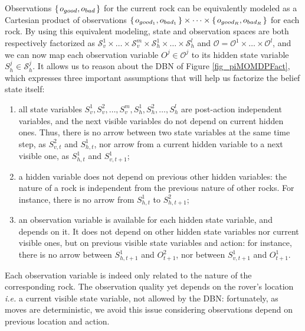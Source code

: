 Observations $\left\{ \left.  o_{good},o_{bad}  \right. \right\}$ for the current rock can be equivalently 
modeled as a Cartesian product of observations $\left\{ \left.  o_{good_1},o_{bad_1}  \right. \right\} \times \cdots \times \left\{ \left.  o_{good_R},o_{bad_R}  \right. \right\}$ 
for each rock. By using this equivalent modeling, state and observation spaces 
are both respectively factorized as 
$\mathcal{S}^1_v \times \ldots \times \mathcal{S}^m_v \times \mathcal{S}^1_h \times \ldots \times \mathcal{S}^l_h $
 and $\mathcal{O} = \mathcal{O}^1 \times \ldots \times \mathcal{O}^l$, and we can now map each observation variable 
$O^j \in \mathcal{O}^j$ to its hidden state variable $S^j_h \in \mathcal{S}^j_h$. 
It allows us to reason 
about the DBN of Figure \ref{fig_piMOMDPFact}, 
which expresses three important assumptions 
that will help us factorize the belief state itself:
\begin{enumerate}
\item all state variables $S^1_v,S^2_v,\ldots,S^m_v,S^1_h,S^2_h,\ldots,S^l_h$ are post-action independent 
variables, and the next visible variables do not depend on current hidden ones.
Thus, there is no arrow between two state variables at the same time step, as $S^2_{v,t}$ and $S^1_{h,t}$,
nor arrow from a current hidden variable to a next visible one, as $S^1_{h,t}$ and $S^1_{v,t+1}$;
\item a hidden variable does not depend on previous other hidden variables: the nature of a rock is 
independent from the previous nature of other rocks. 
For instance, there is no arrow from $S^1_{h,t}$ to $S^2_{h,t+1}$;
\item an observation variable is available for each hidden state variable,
and depends on it. 
It does not depend on other 
hidden state variables 
nor current visible ones, 
but on previous visible state variables and action:
for instance, there is no arrow between $S^1_{h,t+1}$ and $O^2_{t+1}$, 
nor between $S^1_{v,t+1}$ and $O^1_{t+1}$. 
\end{enumerate}
Each observation 
variable is indeed only related 
to the nature of the corresponding rock. 
The observation quality yet depends on the rover's location 
\emph{i.e.} a current visible state variable, 
not allowed by the DBN: 
fortunately, as moves are deterministic, 
we avoid this issue considering observations depend on previous location and action.


